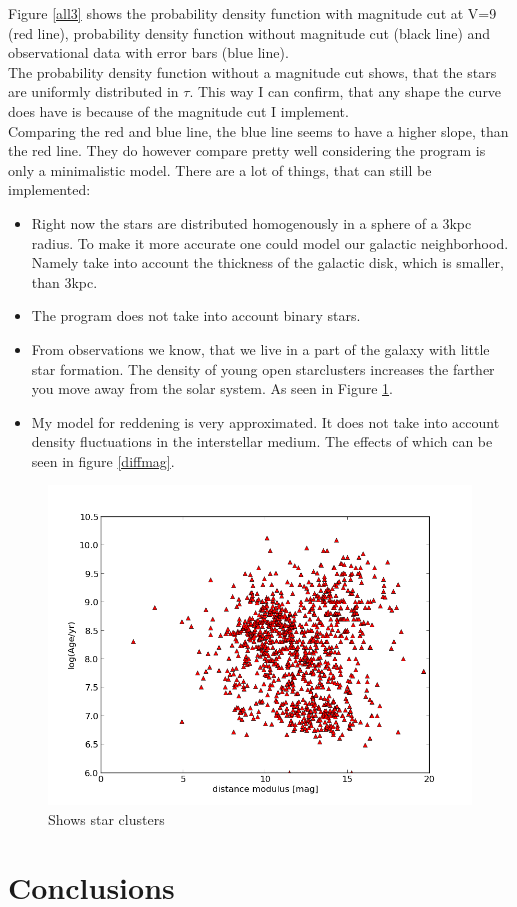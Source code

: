 \documentclass[a4paper,10pt]{article}
\begin{document}
 Figure \ref{all3} shows the probability density function with magnitude cut at V=9 (red line), probability density function without 
 magnitude cut (black line) and observational data with error bars (blue line).\\
 The probability density function without a magnitude cut shows, that the stars are uniformly distributed in $\tau$. This way I can confirm, 
 that any shape the curve does have is because of the magnitude cut I implement. \\
 Comparing the red and blue line, the blue line seems to have a higher slope, than the red line. They do however compare pretty well 
 considering the program is only a minimalistic model. There are a lot of things, that can still be implemented:\\
 \begin{itemize}
  \item Right now the stars are distributed homogenously in a sphere of a 3kpc radius. To make it more accurate one could model our
  galactic neighborhood. Namely take into account the thickness of the galactic disk, which is smaller, than 3kpc.
  \item The program does not take into account binary stars. 
  \item From observations we know, that we live in a part of the galaxy with little star formation.  
  The density of young open starclusters increases the farther you move away from the solar system. As seen in Figure \ref{clusters}.
  \item My model for reddening is very approximated. It does not take into account density fluctuations in the interstellar medium. 
  The effects of which can be seen in figure \ref{diffmag}.
 \end{itemize}
 \begin{figure}
  \includegraphics[width=\textwidth]{clusters}
  \caption{Shows star clusters\label{clusters}}
 \end{figure}

 
 \section{Conclusions}
 
 
\end{document}
